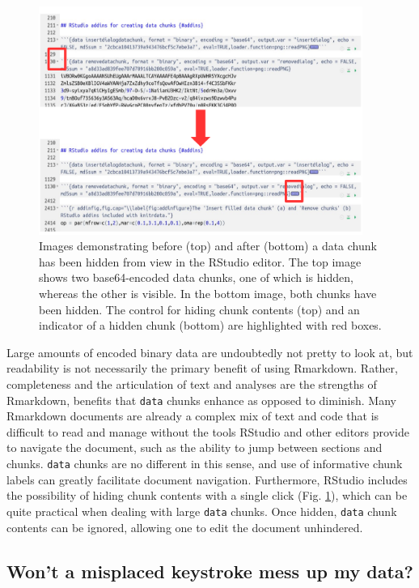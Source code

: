 \begin{figure}
\includegraphics[width=400px]{open-close-chunk-fig} \caption{Images demonstrating before (top) and after (bottom) a data chunk has been hidden from view in the RStudio editor. The top image shows two base64-encoded data chunks, one of which is hidden, whereas the other is visible. In the bottom image, both chunks have been hidden. The control for hiding chunk contents (top) and an indicator of a hidden chunk (bottom) are highlighted with red boxes.}\label{fig:openclosechunkfig}
\end{figure}

Large amounts of encoded binary data are undoubtedly not pretty to look at, but readability is not necessarily the primary benefit of using Rmarkdown. Rather, completeness and the articulation of text and analyses are the strengths of Rmarkdown, benefits that \texttt{data} chunks enhance as opposed to diminish. Many Rmarkdown documents are already a complex mix of text and code that is difficult to read and manage without the tools RStudio and other editors provide to navigate the document, such as the ability to jump between sections and chunks. \texttt{data} chunks are no different in this sense, and use of informative chunk labels can greatly facilitate document navigation. Furthermore, RStudio includes the possibility of hiding chunk contents with a single click (Fig. \ref{fig:openclosechunkfig}), which can be quite practical when dealing with large \texttt{data} chunks. Once hidden, \texttt{data} chunk contents can be ignored, allowing one to edit the document unhindered.

\hypertarget{integrity}{%
\subsection{Won't a misplaced keystroke mess up my data?}\label{integrity}}

